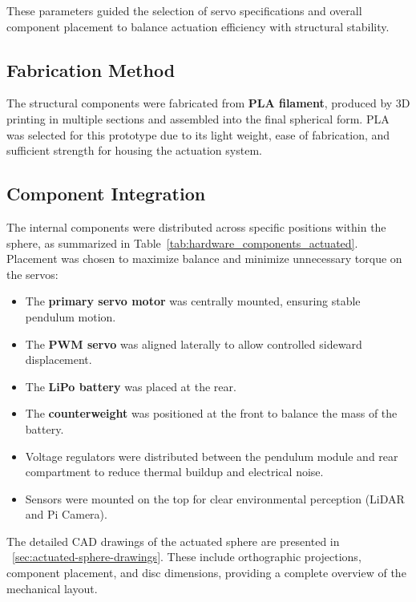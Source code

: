\documentclass[english, bachelor, utf8]{base/thesis_telematics}
\begin{document}
These parameters guided the selection of servo specifications and overall component placement to balance actuation efficiency with structural stability.  

\subsection{Fabrication Method}
The structural components were fabricated from \textbf{PLA filament}, produced by 3D printing in multiple sections and assembled into the final spherical form. PLA was selected for this prototype due to its light weight, ease of fabrication, and sufficient strength for housing the actuation system.  

\subsection{Component Integration}
The internal components were distributed across specific positions within the sphere, as summarized in Table~\ref{tab:hardware_components_actuated}. Placement was chosen to maximize balance and minimize unnecessary torque on the servos:  

\begin{itemize}
    \item The \textbf{primary servo motor} was centrally mounted, ensuring stable pendulum motion.  
    \item The \textbf{PWM servo} was aligned laterally to allow controlled sideward displacement.  
    \item The \textbf{LiPo battery} was placed at the rear.
    \item The \textbf{counterweight} was positioned at the front to balance the mass of the battery.
    \item Voltage regulators were distributed between the pendulum module and rear compartment to reduce thermal buildup and electrical noise.  
    \item Sensors were mounted on the top for clear environmental perception (LiDAR and Pi Camera).  
\end{itemize}

The detailed CAD drawings of the actuated sphere are presented in ~\ref{sec:actuated-sphere-drawings}.
These include orthographic projections, component placement, and disc dimensions, providing a complete overview of the mechanical layout.  
\end{document}
